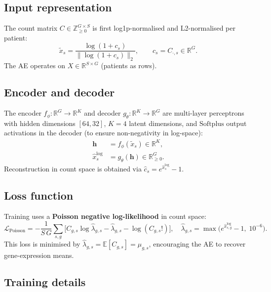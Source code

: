 \documentclass[11pt,a4paper]{article}
\newcommand{\R}{\mathbb{R}}
\newcommand{\E}{\mathbb{E}}
\theoremstyle{definition}
\begin{document}
\subsection{Input representation}

The count matrix $C \in \mathbb{Z}_{\geq 0}^{G \times S}$ is first
log1p-normalised and L2-normalised per patient:
\begin{equation}
  \tilde{x}_s = \frac{\log(1 + c_s)}{\|\log(1 + c_s)\|_2},
  \qquad c_s = C_{\cdot,s} \in \R^G.
  \label{eq:input_transform}
\end{equation}
The AE operates on $X \in \R^{S \times G}$ (patients as rows).

\subsection{Encoder and decoder}

The encoder $f_\phi: \R^G \to \R^K$ and decoder $g_\theta: \R^K \to \R^G$
are multi-layer perceptrons with hidden dimensions $[64, 32]$, $K = 4$
latent dimensions, and $\mathrm{Softplus}$ output activations in the decoder
(to ensure non-negativity in log-space):
\begin{align}
  \bm{h} &= f_\phi(\tilde{x}_s) \in \R^K, \label{eq:encoder}\\
  \hat{x}_s^{\log} &= g_\theta(\bm{h}) \in \R^G_{\geq 0}. \label{eq:decoder}
\end{align}
Reconstruction in count space is obtained via $\hat{c}_s = e^{\hat{x}_s^{\log}} - 1$.

\subsection{Loss function}

Training uses a \textbf{Poisson negative log-likelihood} in count space:
\begin{equation}
  \mathcal{L}_{\mathrm{Poisson}}
    = -\frac{1}{S\,G}\sum_{s,g}
        \bigl[C_{g,s}\log\hat{\lambda}_{g,s} - \hat{\lambda}_{g,s} - \log(C_{g,s}!)\bigr],
  \quad
  \hat{\lambda}_{g,s} = \max\!\bigl(e^{\hat{x}_{s,g}^{\log}} - 1,\; 10^{-6}\bigr).
  \label{eq:poisson_loss}
\end{equation}
This loss is minimised by $\hat{\lambda}_{g,s} = \E[C_{g,s}] = \mu_{g,s}$,
encouraging the AE to recover gene-expression means.

\subsection{Training details}
\end{document}
